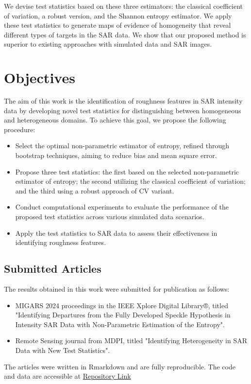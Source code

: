 We devise test statistics based on these three estimators: the classical
coefficient of variation, a robust version, and the Shannon entropy
estimator. We apply these test statistics to generate maps of evidence
of homogeneity that reveal different types of targets in the SAR data.
We show that our proposed method is superior to existing approaches with
simulated data and SAR images.





\section{Objectives}

The aim of this work is the identification of roughness features in SAR intensity data by developing novel test statistics for distinguishing between homogeneous and heterogeneous domains. 
To achieve this goal, we propose the following procedure:

\begin{itemize}
    \item Select the optimal non-parametric estimator of entropy, refined through bootstrap techniques, aiming to reduce bias and mean square error.
    \item Propose three test statistics: the first based on the selected non-parametric estimator of entropy; the second utilizing the classical coefficient of variation; and the third using a robust approach of CV variant.
    \item Conduct computational experiments to evaluate the performance of the proposed test statistics across various simulated data scenarios.
    \item Apply the test statistics to SAR data to assess their effectiveness in identifying roughness features.
\end{itemize}

\subsection*{Submitted Articles}

The results obtained in this work were submitted for publication as follows:
\begin{itemize}
    \item  MIGARS 2024 proceedings in the IEEE Xplore Digital Library®, titled "Identifying Departures from the Fully Developed Speckle Hypothesis in Intensity SAR Data with Non-Parametric Estimation of the Entropy".
    \item  Remote Sensing journal from MDPI, titled "Identifying Heterogeneity in SAR Data with New Test Statistics".
\end{itemize}
The articles were written in Rmarkdown and are fully reproducible. 
The code and data are accessible at 
\href{https://github.com/rjaneth/identifying-heterogeneity-in-sar-data-with-new-test-statistics}{\textcolor[rgb]{0,0,1}{Repository Link}}


